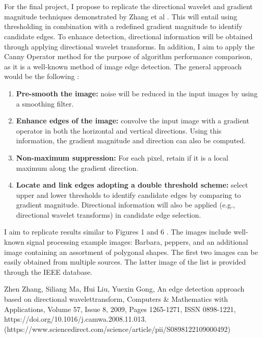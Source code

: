 \documentclass[./abstract_proposal.tex]{subfiles}
\begin{document}
\\ \\
\noindent For the final project, I propose to replicate the directional wavelet and gradient magnitude techniques demonstrated by Zhang et al \cite{redef_gradient}.  This will entail using thresholding in combination with a redefined gradient magnitude to identify candidate edges.  To enhance detection, directional information will be obtained through applying directional wavelet transforms.  In addition, I aim to apply the Canny Operator method for the purpose of algorithm performance comparison, as it is a well-known method of image edge detection.  The general approach would be the following \cite{redef_gradient}: 

\begin{enumerate}
\item \textbf{Pre-smooth the image:} noise will be reduced in the input images by using a smoothing filter.
\item \textbf{Enhance edges of the image:} convolve the input image with a gradient operator in both the horizontal and vertical directions. Using this information, the gradient magnitude and direction can also be computed.
\item \textbf{Non-maximum suppression:} For each pixel, retain if it is a local maximum along the gradient direction. 
\item \textbf{Locate and link edges adopting a double threshold scheme:} select upper and lower thresholds to identify candidate edges by comparing to gradient magnitude.  Directional information will also be applied (e.g., directional wavelet transforms) in candidate edge selection. 
\end{enumerate}


\noindent I aim to replicate results similar to Figures 1 and 6 \cite{redef_gradient}.  The images include well-known signal processing example images: Barbara, peppers, and an additional image containing an assortment of polygonal shapes.  The first two images can be easily obtained from multiple sources.  The latter image of the list is provided through the IEEE database.   

\clearpage

\begin{thebibliography}{9}
Zhen Zhang, Siliang Ma, Hui Liu, Yuexin Gong, An edge detection approach based on directional wavelettransform, Computers \& Mathematics with Applications, Volume 57, Issue 8, 2009, Pages 1265-1271,
ISSN 0898-1221, https://doi.org/10.1016/j.camwa.2008.11.013. (https://www.sciencedirect.com/science/article/pii/S0898122109000492)
\end{thebibliography}
\end{document}
